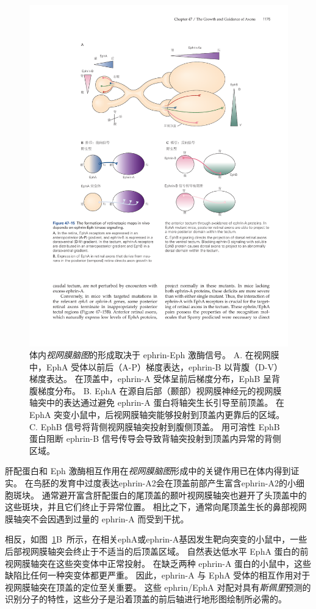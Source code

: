 \begin{figure}[htbp]
	\centering
	\includegraphics[width=0.84\linewidth]{chap47/fig_47_15}
	\caption{体内\textit{视网膜脑图}的形成取决于 ephrin-Eph 激酶信号。
		A. 在视网膜中，EphA 受体以前后（A-P）梯度表达，ephrin-B 以背腹（D-V）梯度表达。 
		在顶盖中，ephrin-A 受体呈前后梯度分布，EphB 呈背腹梯度分布。
		B. EphA 在源自后部（颞部）视网膜神经元的视网膜轴突中的表达通过避免 ephrin-A 蛋白将轴突生长引导至前顶盖。
		在 EphA 突变小鼠中，后视网膜轴突能够投射到顶盖内更靠后的区域。
		C. EphB 信号将背侧视网膜轴突投射到腹侧顶盖。
		用可溶性 EphB 蛋白阻断 ephrin-B 信号传导会导致背轴突投射到顶盖内异常的背侧区域。}
	\label{fig:47_15}
\end{figure}


肝配蛋白和 Eph 激酶相互作用在\textit{视网膜脑图}形成中的关键作用已在体内得到证实。
在鸟胚的发育中过度表达ephrin-A2会在顶盖前部产生富含ephrin-A2的小细胞斑块。
通常避开富含肝配蛋白的尾顶盖的颞叶视网膜轴突也避开了头顶盖中的这些斑块，并且它们终止于异常位置。
相比之下，通常向尾顶盖生长的鼻部视网膜轴突不会因遇到过量的 ephrin-A 而受到干扰。


相反，如图~\ref{fig:47_15}B~所示，在相关ephA或ephrin-A基因发生靶向突变的小鼠中，一些后部视网膜轴突会终止于不适当的后顶盖区域。
自然表达低水平 EphA 蛋白的前视网膜轴突在这些突变体中正常投射。
在缺乏两种 ephrin-A 蛋白的小鼠中，这些缺陷比任何一种突变体都更严重。
因此，ephrin-A 与 EphA 受体的相互作用对于视网膜轴突在顶盖的定位至关重要。
这些 ephrin/EphA 对配对具有\textit{斯佩里}预测的识别分子的特性，这些分子是沿着顶盖的前后轴进行地形图绘制所必需的。


